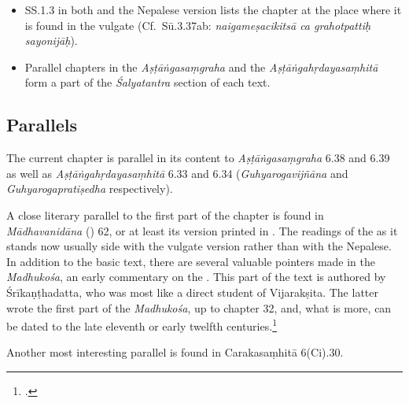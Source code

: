 \begin{itemize}
        \item SS.1.3 in both \cite{vulgate} and the Nepalese version lists the chapter at
        the place where it is found in the vulgate (Cf.\ Sū.3.37ab:
        \emph{naigameṣacikitsā ca grahotpattiḥ sayonijāḥ}). 
        
        \item Parallel chapters in the \emph{Aṣṭāṅgasaṃgraha} and the
        \emph{Aṣṭāṅgahṛdayasaṃhitā} form a part of the \emph{Śalyatantra} section of 
        each
        text.
    \end{itemize} 
    
    \subsection{Parallels}
    
    The current chapter is parallel in its content to \emph{Aṣṭāṅgasaṃgraha} 6.38 
    and 6.39 as well as \emph{Aṣṭāṅgahṛdayasaṃhitā} 6.33 and 6.34 
    (\emph{Guhyarogavijñāna} and \emph{Guhyarogapratiṣedha} respectively).%
    
    A close literary parallel to the first part of the chapter is found in
    \emph{Mādhavanidāna} (\cite{madhava}) 62, or at least its version printed in
    \citet[361]{madhava}. The readings of the \cite{madhava} as it stands now usually
    side with the vulgate version rather than with the Nepalese. In addition to the
    basic text, there are several valuable pointers made in the \emph{Madhukośa}, an
    early commentary on the \cite{madhava}. This part of the text is authored by 
    Śrīkaṇṭhadatta,
    who was most like a direct student of Vijarakṣita. The latter wrote the first part
    of the \emph{Madhukośa}, up to chapter 32, and, what is more, can be dated to the
    late eleventh or early twelfth centuries.\footcite[22--26]{meul-1974}
    
    Another most interesting parallel is found in Carakasaṃhitā 6(Ci).30.
    
